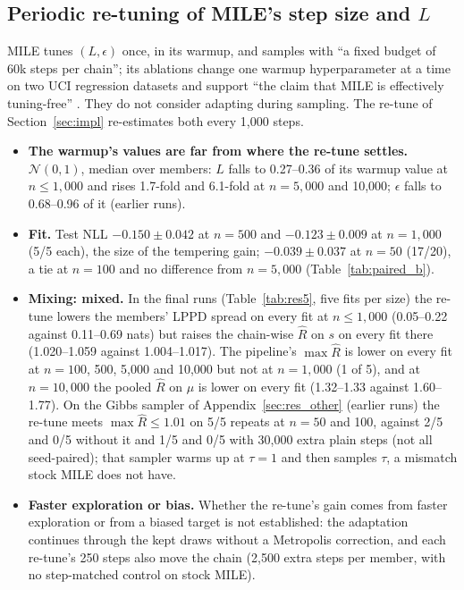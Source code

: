 \documentclass[11pt]{article}
\newcommand{\nzo}{\mathcal{N}(0,1)}
\begin{document}
\subsection{Periodic re-tuning of MILE's step size and \texorpdfstring{$L$}{L}}
\label{sec:retune}
MILE tunes $(L,\epsilon)$ once, in its warmup, and samples with ``a fixed budget of 60k steps per chain''; its
ablations change one warmup hyperparameter at a time on two UCI regression datasets and support ``the claim that MILE is
effectively tuning-free'' \citep[Sec.~4.3, App.~A.2]{sommer2025mile}. They do not consider adapting during sampling. The
re-tune of Section~\ref{sec:impl} re-estimates both every 1{,}000 steps.
\begin{itemize}
\item \textbf{The warmup's values are far from where the re-tune settles.} $\nzo$, median over members: $L$ falls to
  0.27--0.36 of its warmup value at $n\le1{,}000$ and rises 1.7-fold and 6.1-fold at $n=5{,}000$ and 10{,}000; $\epsilon$
  falls to 0.68--0.96 of it (earlier runs).
\item \textbf{Fit.} Test NLL $-0.150\pm0.042$ at $n=500$ and $-0.123\pm0.009$ at $n=1{,}000$ (5/5 each), the size of the
  tempering gain; $-0.039\pm0.037$ at $n=50$ (17/20), a tie at $n=100$ and no difference from $n=5{,}000$
  (Table~\ref{tab:paired_b}).
\item \textbf{Mixing: mixed.} In the final runs (Table~\ref{tab:res5}, five fits per size) the re-tune lowers the
  members' LPPD spread on every fit at $n\le1{,}000$ (0.05--0.22 against 0.11--0.69 nats) but raises the chain-wise
  $\widehat R$ on $s$ on every fit there (1.020--1.059 against 1.004--1.017). The pipeline's $\max\widehat R$ is lower on
  every fit at $n=100$, 500, 5{,}000 and 10{,}000 but not at $n=1{,}000$ (1 of 5), and at $n=10{,}000$ the pooled
  $\widehat R$ on $\mu$ is lower on every fit (1.32--1.33 against 1.60--1.77). On the Gibbs sampler of
  Appendix~\ref{sec:res_other} (earlier runs) the re-tune meets $\max\widehat R\le1.01$ on 5/5 repeats at $n=50$ and 100,
  against 2/5 and 0/5 without it and 1/5 and 0/5 with 30{,}000 extra plain steps (not all seed-paired); that sampler
  warms up at $\tau=1$ and then samples $\tau$, a mismatch stock MILE does not have.
\item \textbf{Faster exploration or bias.} Whether the re-tune's gain comes from faster exploration or from a biased
  target is not established: the adaptation continues through the kept draws without a Metropolis correction, and each
  re-tune's 250 steps also move the chain (2{,}500 extra steps per member, with no step-matched control on stock MILE).
\end{itemize}
\end{document}
